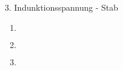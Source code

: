 \documentclass{alex_hü}
\begin{document}
\begin{mybox}{3. Indunktionsspannung - Stab}
	\centering \(  \)
	\tcblower
	\begin{enumerate}
		\item \(  \)
%			
	\tcbline
		\item \(  \)
	\tcbline
		\item 
%			
	\end{enumerate}
\end{mybox}
\end{document}
